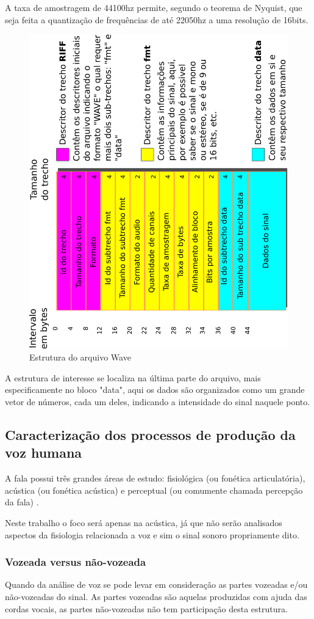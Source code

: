 \documentclass[a4paper,12pt,openright,oneside]{book}
\newenvironment{myenv}[1]
  {\begin{spacing}{#1}}
  {\end{spacing}}
\begin{document}
\begin{myenv}{1.5}
					\par A taxa de amostragem de 44100hz permite, segundo o teorema de Nyquist, que seja feita a quantização de frequências de até 22050hz a uma resolução de 16bits.
				
					\begin{figure}[h]
						\centering
						\includegraphics[width=0.45\linewidth, angle=-90]{images/wavePcmStructure.pdf}
						\caption{Estrutura do arquivo Wave}
						\label{fig:wavePcmStructure}
					\end{figure}
					
					\par A estrutura de interesse se localiza na última parte do arquivo, mais especificamente no bloco "data", aqui os dados são organizados como um grande vetor de números, cada um deles, indicando a intensidade do sinal naquele ponto.
				\subsection{Caracterização dos processos de produção da voz humana}
					\par A fala possui três grandes áreas de estudo: fisiológica (ou fonética articulatória),  acústica  (ou fonética acústica)  e  perceptual  (ou  comumente  chamada percepção  da  fala) \cite{kremer2014eficiencia}.
					\par Neste trabalho o foco será apenas na acústica, já que não serão analisados aspectos da fisiologia relacionada a voz e sim o sinal sonoro propriamente dito.
					
					\subsubsection{Vozeada versus não-vozeada}

					\par Quando da análise de voz se pode levar em consideração as partes vozeadas e/ou não-vozeadas do sinal. As partes vozeadas são aquelas produzidas com ajuda das cordas vocais, as partes não-vozeadas não tem participação desta estrutura.
					

\end{myenv}
\end{document}
